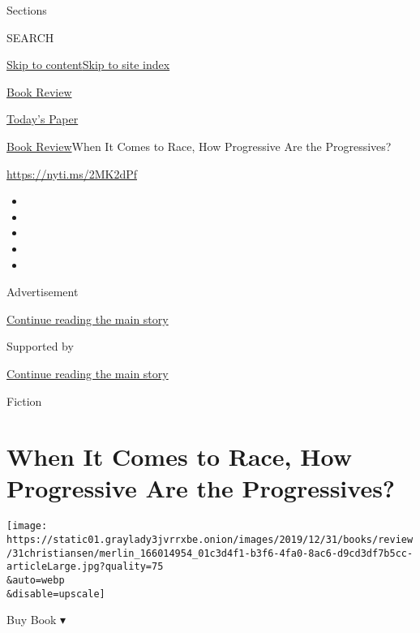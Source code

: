 Sections

SEARCH

\protect\hyperlink{site-content}{Skip to
content}\protect\hyperlink{site-index}{Skip to site index}

\href{https://www.nytimes3xbfgragh.onion/section/books/review}{Book
Review}

\href{https://myaccount.nytimes3xbfgragh.onion/auth/login?response_type=cookie\&client_id=vi}{}

\href{https://www.nytimes3xbfgragh.onion/section/todayspaper}{Today's
Paper}

\href{/section/books/review}{Book Review}\textbar{}When It Comes to
Race, How Progressive Are the Progressives?

\url{https://nyti.ms/2MK2dPf}

\begin{itemize}
\item
\item
\item
\item
\item
\end{itemize}

Advertisement

\protect\hyperlink{after-top}{Continue reading the main story}

Supported by

\protect\hyperlink{after-sponsor}{Continue reading the main story}

Fiction

\hypertarget{when-it-comes-to-race-how-progressive-are-the-progressives}{%
\section{When It Comes to Race, How Progressive Are the
Progressives?}\label{when-it-comes-to-race-how-progressive-are-the-progressives}}

\texttt{[image: https://static01.graylady3jvrrxbe.onion/images/2019/12/31/books/review/31christiansen/merlin\_166014954\_01c3d4f1-b3f6-4fa0-8ac6-d9cd3df7b5cc-articleLarge.jpg?quality=75\\\&auto=webp\\\&disable=upscale]}

Buy Book ▾

